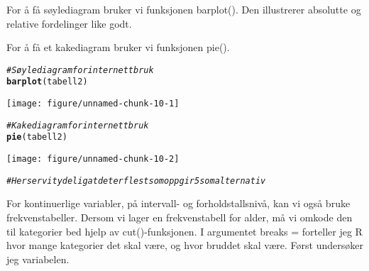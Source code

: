 \documentclass[a4 paper, 12pt]{article}\usepackage[]{graphicx}\usepackage[]{color}
\makeatletter
\def\maxwidth{ %
  \ifdim\Gin@nat@width>\linewidth
    \linewidth
  \else
    \Gin@nat@width
  \fi
}
\newcommand{\hlcom}[1]{\textcolor[rgb]{0.678,0.584,0.686}{\textit{#1}}}%
\newcommand{\hlstd}[1]{\textcolor[rgb]{0.345,0.345,0.345}{#1}}%
\newcommand{\hlkwd}[1]{\textcolor[rgb]{0.737,0.353,0.396}{\textbf{#1}}}%
\newenvironment{kframe}{%
 \def\at@end@of@kframe{}%
 \ifinner\ifhmode%
  \def\at@end@of@kframe{\end{minipage}}%
  \begin{minipage}{\columnwidth}%
 \fi\fi%
 \def\FrameCommand##1{\hskip\@totalleftmargin \hskip-\fboxsep
 \colorbox{shadecolor}{##1}\hskip-\fboxsep
     \hskip-\linewidth \hskip-\@totalleftmargin \hskip\columnwidth}%
 \MakeFramed {\advance\hsize-\width
   \@totalleftmargin\z@ \linewidth\hsize
   \@setminipage}}%
 {\par\unskip\endMakeFramed%
 \at@end@of@kframe}
\newenvironment{knitrout}{}{} %
\makeatother
\begin{document}
\begin{enumerate}
       For å få søylediagram bruker vi funksjonen barplot(). Den illustrerer absolutte og relative fordelinger like godt. 
       
       For å få et kakediagram bruker vi funksjonen pie().
       
\begin{knitrout}\footnotesize
{}\color{fgcolor}\begin{kframe}
\begin{alltt}
  \hlcom{# Søylediagram for internettbruk}
  \hlkwd{barplot}\hlstd{(tabell2)}
\end{alltt}
\end{kframe}
\texttt{[image: figure/unnamed-chunk-10-1]} 
\begin{kframe}\begin{alltt}
\hlcom{# Kakediagram for internettbruk }
\hlkwd{pie}\hlstd{(tabell2)}
\end{alltt}
\end{kframe}
\texttt{[image: figure/unnamed-chunk-10-2]} 
\begin{kframe}\begin{alltt}
\hlcom{# Her ser vi tydelig at det er flest som oppgir 5 som alternativ }
\end{alltt}
\end{kframe}
\end{knitrout}
         
         For kontinuerlige variabler, på intervall- og forholdstallsnivå, kan vi også bruke frekvenstabeller. Dersom vi lager en frekvenstabell for alder, må vi omkode den til kategorier bed hjelp av cut()-funksjonen. I argumentet breaks = forteller jeg R hvor mange kategorier det skal være, og hvor bruddet skal være. Først undersøker jeg variabelen. 
       

\end{enumerate}
\end{document}
